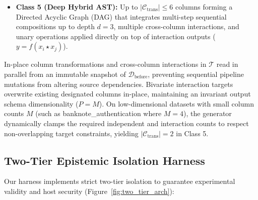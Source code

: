 \documentclass[sigconf]{acmart}
\begin{document}
\begin{itemize}
\begin{equation}
    \quad \text{or} \quad
    z = \begin{cases} x_i & \text{if } x_j > \theta, \\ 0 & \text{otherwise} \end{cases}
    \end{equation}
    where $h(x) \in \{1, x, \ln x\}$ corresponds to the active branch of the unary operators in $\Omega_5$ (when $g(x)$ is subsequently composed with an outer unary function $f_{j,2}$ at depth $d=2$, the inactive branch evaluates to $f_{j,2}(0)$), and \texttt{PiecewiseLog} is implemented via guarded vectorization (\texttt{np.where(x > 0, np.log(np.maximum(x, 1e-12)), 0.0)}) to prevent non-finite runtime exceptions over zero or negative domain values.
    \item \textbf{Class 5 (Deep Hybrid AST):} Up to $|\mathcal{C}_{\text{trans}}| \le 6$ columns forming a Directed Acyclic Graph (DAG) that integrates multi-step sequential compositions up to depth $d=3$, multiple cross-column interactions, and unary operations applied directly on top of interaction outputs ($y = f(x_i \star x_j)$).
\end{itemize}
In-place column transformations and cross-column interactions in $\mathcal{T}$ read in parallel from an immutable snapshot of $\mathcal{D}_{\text{before}}$, preventing sequential pipeline mutations from altering source dependencies. Bivariate interaction targets overwrite existing designated columns in-place, maintaining an invariant output schema dimensionality ($P = M$). On low-dimensional datasets with small column counts $M$ (such as \textsf{banknote\_authentication} where $M=4$), the generator dynamically clamps the required independent and interaction counts to respect non-overlapping target constraints, yielding $|\mathcal{C}_{\text{trans}}| = 2$ in Class 5.

\subsection{Two-Tier Epistemic Isolation Harness}
Our harness implements strict two-tier isolation to guarantee experimental validity and host security (Figure~\ref{fig:two_tier_arch}):
\end{document}
